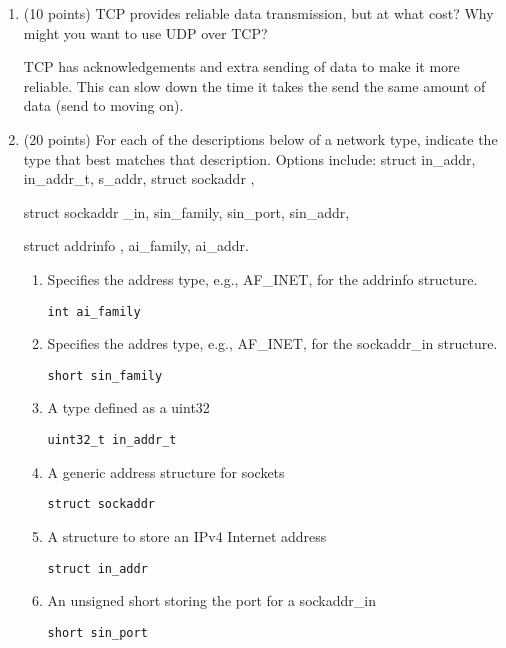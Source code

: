 \documentclass{article}[9pt]
\newenvironment{myanswer}{\begin{mdframed}\begin{answerfont}}{\end{answerfont}\end{mdframed}}
\begin{document}
\begin{enumerate}
\item (10 points) TCP provides reliable data transmission, but at what cost? Why
might you want to use UDP over TCP?
\begin{myanswer}
TCP has acknowledgements and extra sending of data to make it more
reliable.  This can slow down the time it takes the send the same amount
of data (send to moving on).
\end{myanswer}

\item (20 points) For each of the descriptions below of a network type, indicate
the type that best matches that description. Options include:
struct in\_addr, in\_addr\_t, s\_addr, 
struct sockaddr
,

struct sockaddr
\_in, sin\_family, sin\_port, sin\_addr,

struct addrinfo
, ai\_family, ai\_addr.


\begin{enumerate}
\item Specifies the address type, e.g., AF\_INET, for the
addrinfo structure.
\begin{myanswer}
\texttt{int ai\_family}
\end{myanswer}

\item Specifies the addres type, e.g., AF\_INET, for the
sockaddr\_in structure.
\begin{myanswer}
\texttt{short sin\_family}
\end{myanswer}

\item A type defined as a uint32
\begin{myanswer}
\texttt{uint32\_t in\_addr\_t}
\end{myanswer}

\item A generic address structure for sockets
\begin{myanswer}
\texttt{struct sockaddr}
\end{myanswer}

\item A structure to store an IPv4 Internet address
\begin{myanswer}
\texttt{struct in\_addr}
\end{myanswer}

\item An unsigned short storing the port for a sockaddr\_in
\begin{myanswer}
\texttt{short sin\_port}
\end{myanswer}


\end{enumerate}
\end{enumerate}
\end{document}
